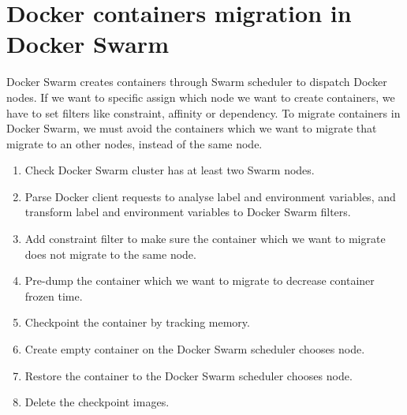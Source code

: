 \section{Docker containers migration in Docker Swarm}
Docker Swarm creates containers through Swarm scheduler to dispatch Docker nodes. If we want to specific assign which node we want to create containers, we have to set filters like constraint, affinity or dependency. To migrate containers in Docker Swarm, we must avoid the containers which we want to migrate that migrate to an other nodes, instead of the same node.
\begin{enumerate}[Step 1.]
	\item Check Docker Swarm cluster has at least two Swarm nodes.
    \item Parse Docker client requests to analyse label and environment variables, and transform label and environment variables to Docker Swarm filters.
    \item Add constraint filter to make sure the container which we want to migrate does not migrate to the same node.
    \item Pre-dump the container which we want to migrate to decrease container frozen time.
    \item Checkpoint the container by tracking memory.
    \item Create empty container on the Docker Swarm scheduler chooses node.
    \item Restore the container to the Docker Swarm scheduler chooses node.
    \item Delete the checkpoint images.
\end{enumerate}

